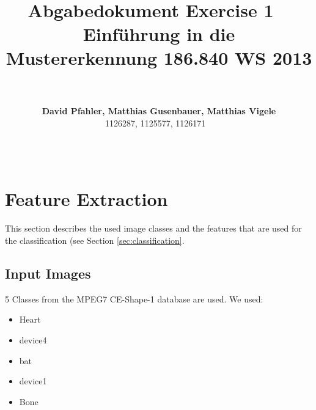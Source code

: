 \documentclass[a4paper,psfig,subfigure,epsfig,fleqn,amssmb,float,caption,fontenc,ausarbeitung]{article}
\begin{document}
\date{}

\title{~\\
  ~\\
  \fontsize{14}{14pt} \bf Abgabedokument Exercise 1
	 ~\\
  \fontsize{12}{12pt} \bf Einführung in die Mustererkennung 186.840 WS 2013}

\author{~\\
  ~\\
  \fontsize{12}{12pt}
  {\bf David Pfahler, Matthias Gusenbauer, Matthias Vigele}\\
  1126287, 1125577, 1126171
  ~\\ ~\\ ~\\
  \normalsize
}

\maketitle
\normalfont
\thispagestyle{empty}


\section{Feature Extraction}
\label{sec:featureExtraction}

This section describes the used image classes and the features that are used for the classification (see Section \ref{sec:classification}. 

\subsection{Input Images}
\label{sec:input}

5 Classes from the MPEG7 CE-Shape-1 database \cite{latecki2000shape} are used. We used:

\begin{itemize}
	\item Heart
	\item device4
	\item bat
	\item device1
	\item Bone
\end{itemize}
\end{document}

